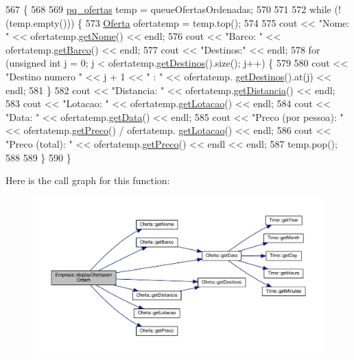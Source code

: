 \begin{DoxyCode}
567                                     \{
568 
569     \hyperlink{cruise_8h_a50ef8d79980af734cd40fd8d4c2ad566}{pq\_ofertas} temp = queueOfertasOrdenadas;
570 
571 
572     \textcolor{keywordflow}{while} (!(temp.empty())) \{
573         \hyperlink{classOferta}{Oferta} ofertatemp = temp.top();
574 
575         cout << \textcolor{stringliteral}{"Nome: "} << ofertatemp.\hyperlink{classOferta_a16da38d9f369b000cb544c34200707b8}{getNome}() << endl;
576         cout << \textcolor{stringliteral}{"Barco: "} << ofertatemp.\hyperlink{classOferta_aaed9b5937f9f33d2980fcc13ac02132c}{getBarco}() << endl;
577         cout << \textcolor{stringliteral}{"Destinos:"} << endl;
578         \textcolor{keywordflow}{for} (\textcolor{keywordtype}{unsigned} \textcolor{keywordtype}{int} j = 0; j < ofertatemp.\hyperlink{classOferta_a746c91e5db19098d211a3f6bde2ec8ec}{getDestinos}().size(); j++) \{
579 
580             cout << \textcolor{stringliteral}{"Destino numero "} << j + 1 << \textcolor{stringliteral}{" : "} << ofertatemp.
      \hyperlink{classOferta_a746c91e5db19098d211a3f6bde2ec8ec}{getDestinos}().at(j) << endl;
581         \}
582         cout << \textcolor{stringliteral}{"Distancia: "} << ofertatemp.\hyperlink{classOferta_a0d07f80f25f4fb21c0819c3e25d67fb9}{getDistancia}() << endl;
583         cout << \textcolor{stringliteral}{"Lotacao: "} << ofertatemp.\hyperlink{classOferta_a9c8fbec401e54e590828209931bf25b0}{getLotacao}() << endl;
584         cout << \textcolor{stringliteral}{"Data: "} << ofertatemp.\hyperlink{classOferta_a2b156b75371ad59af54ad96ad79c9d1e}{getData}() << endl;
585         cout << \textcolor{stringliteral}{"Preco (por pessoa): "} << ofertatemp.\hyperlink{classOferta_a6237afc2e8a33fb55b1ef0decf9d9aaa}{getPreco}() / ofertatemp.
      \hyperlink{classOferta_a9c8fbec401e54e590828209931bf25b0}{getLotacao}() << endl;
586         cout << \textcolor{stringliteral}{"Preco (total): "} << ofertatemp.\hyperlink{classOferta_a6237afc2e8a33fb55b1ef0decf9d9aaa}{getPreco}() << endl << endl;
587         temp.pop();
588 
589     \}
590 \}
\end{DoxyCode}


Here is the call graph for this function\+:\nopagebreak
\begin{figure}[H]
\begin{center}
\leavevmode
\includegraphics[width=350pt]{classEmpresa_acd458614a3cca3f432b54212a2e72584_cgraph}
\end{center}
\end{figure}


